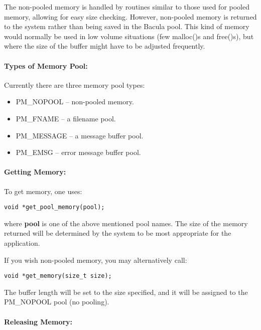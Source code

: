 The non-pooled memory is handled by routines similar to those used for pooled
memory, allowing for easy size checking. However, non-pooled memory is
returned to the system rather than being saved in the Bacula pool. This kind
of memory would normally be used in low volume situations (few malloc()s and
free()s), but where the size of the buffer might have to be adjusted
frequently.

\paragraph*{Types of Memory Pool:}

Currently there are three memory pool types:

\begin{itemize}
\item PM\_NOPOOL -- non-pooled memory.
\item PM\_FNAME -- a filename pool.
\item PM\_MESSAGE -- a message buffer pool.
\item PM\_EMSG -- error message buffer pool.
   \end{itemize}

\paragraph*{Getting Memory:}

To get memory, one uses:

\footnotesize
\begin{verbatim}
void *get_pool_memory(pool);
\end{verbatim}
\normalsize

where {\bf pool} is one of the above mentioned pool names. The size of the
memory returned will be determined by the system to be most appropriate for
the application.

If you wish non-pooled memory, you may alternatively call:

\footnotesize
\begin{verbatim}
void *get_memory(size_t size);
\end{verbatim}
\normalsize

The buffer length will be set to the size specified, and it will be assigned
to the PM\_NOPOOL pool (no pooling).

\paragraph*{Releasing Memory:}

